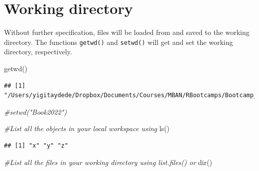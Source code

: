 \documentclass[
]{book}
\newenvironment{Shaded}{\begin{snugshade}}{\end{snugshade}}
\newcommand{\CommentTok}[1]{\textcolor[rgb]{0.56,0.35,0.01}{\textit{#1}}}
\newcommand{\FunctionTok}[1]{\textcolor[rgb]{0.00,0.00,0.00}{#1}}
\newcommand{\NormalTok}[1]{#1}
\theoremstyle{definition}
\theoremstyle{definition}
\theoremstyle{definition}
\theoremstyle{definition}
\theoremstyle{remark}
\begin{document}
\hypertarget{working-directory}{%
\section{Working directory}\label{working-directory}}

Without further specification, files will be loaded from and saved to the working directory. The functions \texttt{getwd()} and \texttt{setwd()} will get and set the working directory, respectively.

\begin{Shaded}
\begin{Highlighting}[]
\FunctionTok{getwd}\NormalTok{()}
\end{Highlighting}
\end{Shaded}

\begin{verbatim}
## [1] "/Users/yigitaydede/Dropbox/Documents/Courses/MBAN/RBootcamps/Bootcamp_book"
\end{verbatim}

\begin{Shaded}
\begin{Highlighting}[]
\CommentTok{\#setwd("Book2022")}

\CommentTok{\#List all the objects in your local workspace using}
\FunctionTok{ls}\NormalTok{()}
\end{Highlighting}
\end{Shaded}

\begin{verbatim}
## [1] "x" "y" "z"
\end{verbatim}

\begin{Shaded}
\begin{Highlighting}[]
\CommentTok{\#List all the files in your working directory using list.files() or }
\FunctionTok{dir}\NormalTok{()}
\end{Highlighting}
\end{Shaded}
\end{document}
